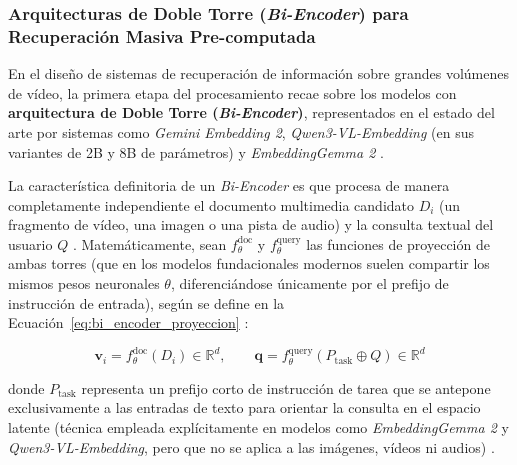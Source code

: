 \subsubsection{Arquitecturas de Doble Torre (\textit{Bi-Encoder}) para Recuperación Masiva Pre-computada}
\label{subsubsec:arquitectura_bi_encoder}

En el diseño de sistemas de recuperación de información sobre grandes volúmenes de vídeo, la primera etapa del procesamiento recae sobre los modelos con \textbf{arquitectura de Doble Torre (\textit{Bi-Encoder})}, representados en el estado del arte por sistemas como \textit{Gemini Embedding 2}, \textit{Qwen3-VL-Embedding} (en sus variantes de 2B y 8B de parámetros) y \textit{EmbeddingGemma 2} \cite{gemini_emb2_docs, qwen3_vl_emb2026}.

La característica definitoria de un \textit{Bi-Encoder} es que procesa de manera completamente independiente el documento multimedia candidato $D_i$ (un fragmento de vídeo, una imagen o una pista de audio) y la consulta textual del usuario $Q$ \cite{learnopencv_qwen3, qwen3_vl_emb2026}. Matemáticamente, sean $f_{\theta}^{\text{doc}}$ y $f_{\theta}^{\text{query}}$ las funciones de proyección de ambas torres (que en los modelos fundacionales modernos suelen compartir los mismos pesos neuronales $\theta$, diferenciándose únicamente por el prefijo de instrucción de entrada), según se define en la Ecuación~\eqref{eq:bi_encoder_proyeccion} \cite{hf_train_multimodal2026}:

\begin{equation}
\mathbf{v}_i = f_{\theta}^{\text{doc}}(D_i) \in \mathbb{R}^d, \qquad \mathbf{q} = f_{\theta}^{\text{query}}(P_{\text{task}} \oplus Q) \in \mathbb{R}^d
\label{eq:bi_encoder_proyeccion}
\end{equation}

donde $P_{\text{task}}$ representa un prefijo corto de instrucción de tarea que se antepone exclusivamente a las entradas de texto para orientar la consulta en el espacio latente (técnica empleada explícitamente en modelos como \textit{EmbeddingGemma 2} y \textit{Qwen3-VL-Embedding}, pero que no se aplica a las imágenes, vídeos ni audios) \cite{qwen3_vl_emb2026}.

